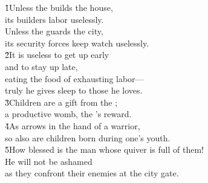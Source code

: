 \begin{poetry}
\poeml \v{1}Unless the  builds the house, \\
\poemll    its builders labor uselessly. \\
\poeml Unless the  guards the city, \\
\poemll    its security forces keep watch uselessly. \\
\poeml \v{2}It is useless to get up early \\
\poemll    and to stay up late, \\
\poeml eating the food of exhausting labor--- \\
\poemll    truly he gives sleep to those he loves. \\
\poeml \v{3}Children are a gift from the ; \\
\poemll    a productive womb, the 's reward. \\
\poeml \v{4}As arrows in the hand of a warrior, \\
\poemll    so also are children born during one's youth. \\
\poeml \v{5}How blessed is the man whose quiver is full of them! \\
\poemll    He will not be ashamed \\
\poemlll       as they confront their enemies at the city gate.
\end{poetry}

